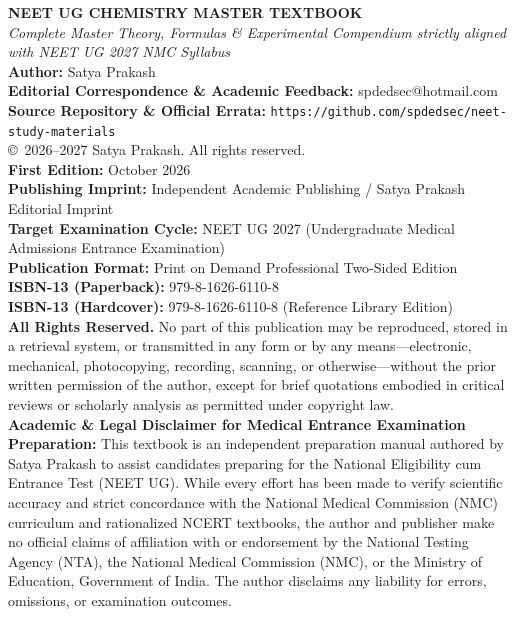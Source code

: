\documentclass[10pt,twoside,openright]{book}
\begin{document}
\thispagestyle{empty}
\vspace*{\fill}
\begin{flushleft}
{\small
\textbf{NEET UG CHEMISTRY MASTER TEXTBOOK}\\[2pt]
\textit{Complete Master Theory, Formulas \& Experimental Compendium strictly aligned with NEET UG 2027 NMC Syllabus}\\[8pt]
\textbf{Author:} Satya Prakash\\
\textbf{Editorial Correspondence \& Academic Feedback:} spdedsec@hotmail.com\\
\textbf{Source Repository \& Official Errata:} \nolinkurl{https://github.com/spdedsec/neet-study-materials}\\[10pt]

\copyright\ 2026--2027 Satya Prakash. All rights reserved.\\[8pt]

\textbf{First Edition:} October 2026\\
\textbf{Publishing Imprint:} Independent Academic Publishing / Satya Prakash Editorial Imprint\\
\textbf{Target Examination Cycle:} NEET UG 2027 (Undergraduate Medical Admissions Entrance Examination)\\
\textbf{Publication Format:} Print on Demand Professional Two-Sided Edition\\
\textbf{ISBN-13 (Paperback):} 979-8-1626-6110-8\\
\textbf{ISBN-13 (Hardcover):} 979-8-1626-6110-8 (Reference Library Edition)\\[10pt]

\textbf{All Rights Reserved.} No part of this publication may be reproduced, stored in a retrieval system, or transmitted in any form or by any means---electronic, mechanical, photocopying, recording, scanning, or otherwise---without the prior written permission of the author, except for brief quotations embodied in critical reviews or scholarly analysis as permitted under copyright law.\\[8pt]

\textbf{Academic \& Legal Disclaimer for Medical Entrance Examination Preparation:} This textbook is an independent preparation manual authored by Satya Prakash to assist candidates preparing for the National Eligibility cum Entrance Test (NEET UG). While every effort has been made to verify scientific accuracy and strict concordance with the National Medical Commission (NMC) curriculum and rationalized NCERT textbooks, the author and publisher make no official claims of affiliation with or endorsement by the National Testing Agency (NTA), the National Medical Commission (NMC), or the Ministry of Education, Government of India. The author disclaims any liability for errors, omissions, or examination outcomes.\\[8pt]

}
\end{flushleft}
\end{document}
